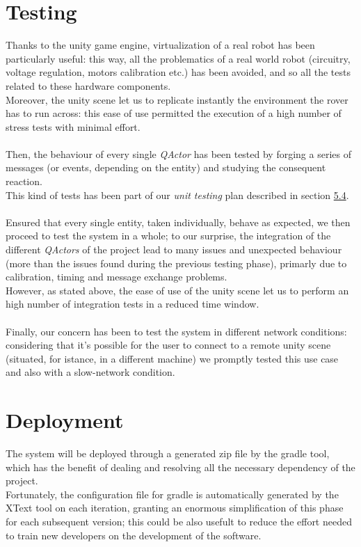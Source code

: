\documentclass{llncs}
\newcommand{\labelsec}[1]{\label{sec:#1}}
\begin{document}
\section{Testing}
\labelsec{testing}
Thanks to the unity game engine, virtualization of a real robot has been particularly useful: this way, all the problematics of a real world robot (circuitry, voltage regulation, motors calibration etc.) has been avoided, and so all the tests related to these hardware components.\\
Moreover, the unity scene let us to replicate instantly the environment the rover has to run across: this ease of use permitted the execution of a high number of stress tests with minimal effort.\\\\
Then, the behaviour of every single \textit{QActor} has been tested by forging a series of messages (or events, depending on the entity) and studying the consequent reaction.\\
This kind of tests has been part of our \textit{unit testing} plan described in section \hyperref[sec:Test plan]{5.4}.\\\\
Ensured that every single entity, taken individually, behave as expected, we then proceed to test the system in a whole; to our surprise, the integration of the different \textit{QActors} of the project lead to many issues and unexpected behaviour (more than the issues found during the previous testing phase), primarly due to calibration, timing and message exchange problems.\\
However, as stated above, the ease of use of the unity scene let us to perform an high number of integration tests in a reduced time window.\\\\
Finally, our concern has been to test the system in different network conditions: considering that it's possible for the user to connect to a remote unity scene (situated, for istance, in a different machine) we promptly tested this use case and also with a slow-network condition.

\section{Deployment}
\labelsec{Deployment}
The system will be deployed through a generated zip file by the gradle tool, which has the benefit of dealing and resolving all the necessary dependency of the project.\\
Fortunately, the configuration file for gradle is automatically generated by the XText tool on each iteration, granting an enormous simplification of this phase for each subsequent version; this could be also usefult to reduce the effort needed to train new developers on the development of the software.
\end{document}
